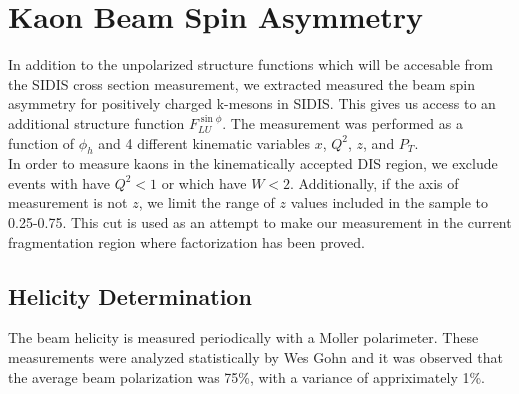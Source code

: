 \section{Kaon Beam Spin Asymmetry}

In addition to the unpolarized structure functions which will be accesable from the SIDIS cross section measurement, we extracted measured the beam spin asymmetry for positively charged k-mesons in SIDIS.  This gives us access to an additional structure function $F_{LU}^{\sin\phi}$.  The measurement was performed as a function of $\phi_h$ and 4 different kinematic variables $x$, $Q^2$, $z$, and $P_T$.  \\

In order to measure kaons in the kinematically accepted DIS region, we exclude events with have $Q^2 < 1$ or which have $W < 2$.  Additionally, if the axis of measurement is not $z$, we limit the range of $z$ values included in the sample to 0.25-0.75.  This cut is used as an attempt to make our measurement in the current fragmentation region where factorization has been proved.  

\subsection{Helicity Determination}
The beam helicity is measured periodically with a Moller polarimeter.  These measurements were analyzed statistically by Wes Gohn and it was observed that the average beam polarization was 75\%, with a variance of appriximately 1\%.  


